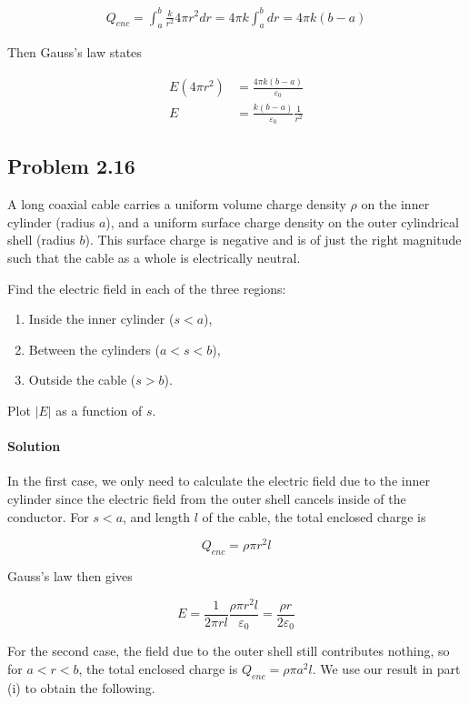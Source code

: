 \documentclass{article}
\begin{document}
\begin{align*}
    Q_{enc} = \int_a^b \frac{k}{r^2}4\pi r^2dr = 4\pi k \int_a^b dr = 4\pi k(b - a)
\end{align*}

Then Gauss's law states 

\begin{align*}
    E(4\pi r^2) &= \frac{4\pi k (b - a)}{\varepsilon_0} \\
    E &= \frac{k(b - a)}{\varepsilon_0}\frac{1}{r^2}
\end{align*}

\newpage

\subsection*{Problem 2.16}
 A long coaxial cable carries a uniform volume charge density $\rho$ on the inner cylinder (radius $a$), and a uniform surface charge density on the outer cylindrical shell (radius $b$). This surface charge is negative and is of just the right magnitude such that the cable as a whole is electrically neutral. 

Find the electric field in each of the three regions:
\begin{enumerate}
    \item Inside the inner cylinder ($s < a$),
    \item Between the cylinders ($a < s < b$),
    \item Outside the cable ($s > b$).
\end{enumerate}

Plot $|E|$ as a function of $s$.

\paragraph{Solution}  In the first case, we only need to calculate the electric field due to the inner cylinder since the electric field from the outer shell cancels inside of the conductor.  For $s < a$, and length $l$ of the cable, the total enclosed charge is 

$$
Q_{enc} = \rho \pi r^2 l
$$

Gauss's law then gives 

$$
E = \frac{1}{2\pi r l}\frac{\rho \pi r^2 l}{\varepsilon_0} = \frac{\rho r}{2\varepsilon_0}
$$

For the second case, the field due to the outer shell still contributes nothing, so for $ a< r< b$, the total enclosed charge is $Q_{enc} = \rho\pi a^2 l$. We use our result in part (i) to obtain the following.
\end{document}
